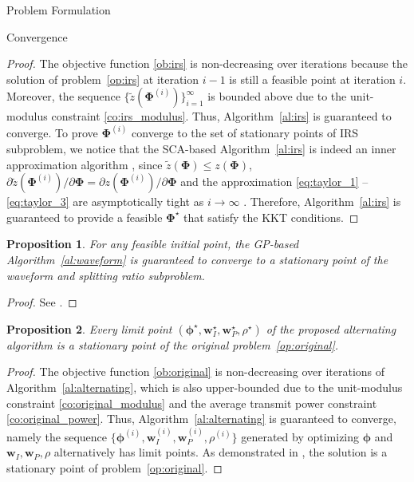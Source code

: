 \documentclass[journal]{IEEEtran}
\newtheorem{proposition}{Proposition}
\begin{document}
\begin{section}{Problem Formulation}
\begin{subsection}{Convergence}
			\begin{proof}\label{pf:irs}
				The objective function \ref{ob:irs} is non-decreasing over iterations because the solution of problem~\ref{op:irs} at iteration $i-1$ is still a feasible point at iteration $i$. Moreover, the sequence $\{\tilde{z}(\boldsymbol{\Phi}^{(i)})\}_{i=1}^{\infty}$ is bounded above due to the unit-modulus constraint \ref{co:irs_modulus}. Thus, Algorithm~\ref{al:irs} is guaranteed to converge. To prove $\boldsymbol{\Phi}^{(i)}$ converge to the set of stationary points of IRS subproblem, we notice that the SCA-based Algorithm~\ref{al:irs} is indeed an inner approximation algorithm \cite{Marks1978}, since $\tilde{z}(\boldsymbol{\Phi}) \le z(\boldsymbol{\Phi})$, $\partial\tilde{z}(\boldsymbol{\Phi}^{(i)})/\partial\boldsymbol{\Phi}=\partial z(\boldsymbol{\Phi}^{(i)})/\partial\boldsymbol{\Phi}$ and the approximation \ref{eq:taylor_1} -- \ref{eq:taylor_3} are asymptotically tight as $i \to \infty$ \cite{Adali2010,Li2013}. Therefore, Algorithm~\ref{al:irs} is guaranteed to provide a feasible $\boldsymbol{\Phi}^{\star}$ that satisfy the KKT conditions.
			\end{proof}

			\begin{proposition}\label{pr:waveform}
				For any feasible initial point, the GP-based Algorithm~\ref{al:waveform} is guaranteed to converge to a stationary point of the waveform and splitting ratio subproblem.
			\end{proposition}

			\begin{proof}\label{pf:waveform}
				See \cite{Clerckx2016a,Clerckx2018b}.
			\end{proof}

			\begin{proposition}\label{pr:ao}
				Every limit point $(\boldsymbol{\phi}^{\star},\boldsymbol{w}_I^{\star},\boldsymbol{w}_P^{\star},\rho^{\star})$ of the proposed alternating algorithm is a stationary point of the original problem~\ref{op:original}.
			\end{proposition}

			\begin{proof}\label{pf:ao}
				The objective function \ref{ob:original} is non-decreasing over iterations of Algorithm~\ref{al:alternating}, which is also upper-bounded due to the unit-modulus constraint \ref{co:original_modulus} and the average transmit power constraint \ref{co:original_power}. Thus, Algorithm~\ref{al:alternating} is guaranteed to converge, namely the sequence $\{\boldsymbol{\phi}^{(i)},\boldsymbol{w}_I^{(i)},\boldsymbol{w}_P^{(i)},\rho^{(i)}\}$ generated by optimizing $\boldsymbol{\phi}$ and $\boldsymbol{w}_I,\boldsymbol{w}_P,\rho$ alternatively has limit points. As demonstrated in \cite{Grippo2000,Hong2016,Li2013a}, the solution is a stationary point of problem~\ref{op:original}.
			\end{proof}
		\end{subsection}
	\end{section}
\end{document}
